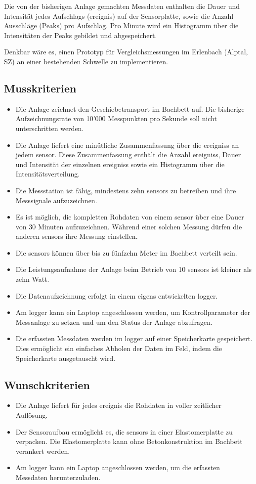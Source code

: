 Die von der bisherigen Anlage gemachten Messdaten enthalten die Dauer und Intensität jedes Aufschlags (\gls{ereignis}) auf der Sensorplatte, sowie die Anzahl Ausschläge (Peaks) pro Aufschlag. Pro Minute wird ein Histogramm über die Intensitäten der Peaks gebildet und abgespeichert.

Denkbar wäre es, einen Prototyp für Vergleichsmessungen im Erlenbach (Alptal, SZ) an einer bestehenden Schwelle zu implementieren.


\subsection{Musskriterien}
\begin{itemize}
\item Die Anlage zeichnet den Geschiebetransport im Bachbett auf. Die bisherige Aufzeichnungsrate von 10'000 Messpunkten pro Sekunde soll nicht unterschritten werden.
\item Die Anlage liefert eine minütliche Zusammenfassung über die \glspl{ereignis} an jedem \gls{sensor}. Diese Zusammenfassung enthält die Anzahl \glspl{ereignis}, Dauer und Intensität der einzelnen \glspl{ereignis} sowie ein Histogramm über die Intensitätsverteilung.
\item Die Messstation ist fähig, mindestens zehn \glspl{sensor} zu betreiben und ihre Messsignale aufzuzeichnen.
\item Es ist möglich, die kompletten Rohdaten von einem \gls{sensor} über eine Dauer von 30 Minuten aufzuzeichnen. Während einer solchen Messung dürfen die anderen \glspl{sensor} ihre Messung einstellen.
\item Die \glspl{sensor} können über bis zu fünfzehn Meter im Bachbett verteilt sein.
\item Die Leistungsaufnahme der Anlage beim Betrieb von 10 \glspl{sensor} ist kleiner als zehn Watt.
\item Die Datenaufzeichnung erfolgt in einem eigens entwickelten \gls{logger}.
\item Am \gls{logger} kann ein Laptop angeschlossen werden, um Kontrollparameter der Messanlage zu setzen und um den Status der Anlage abzufragen.
\item Die erfassten Messdaten werden im \gls{logger} auf einer Speicherkarte gespeichert. Dies ermöglicht ein einfaches Abholen der Daten im Feld, indem die Speicherkarte ausgetauscht wird.
\end{itemize}
\subsection{Wunschkriterien}
\begin{itemize}
\item Die Anlage liefert für jedes \gls{ereignis} die Rohdaten in voller zeitlicher Auflösung.
\item Der Sensoraufbau ermöglicht es, die \glspl{sensor} in einer Elastomerplatte zu verpacken. Die Elastomerplatte kann ohne Betonkonstruktion im Bachbett verankert werden.
\item Am \gls{logger} kann ein Laptop angeschlossen werden, um die erfassten Messdaten herunterzuladen.
\end{itemize}
